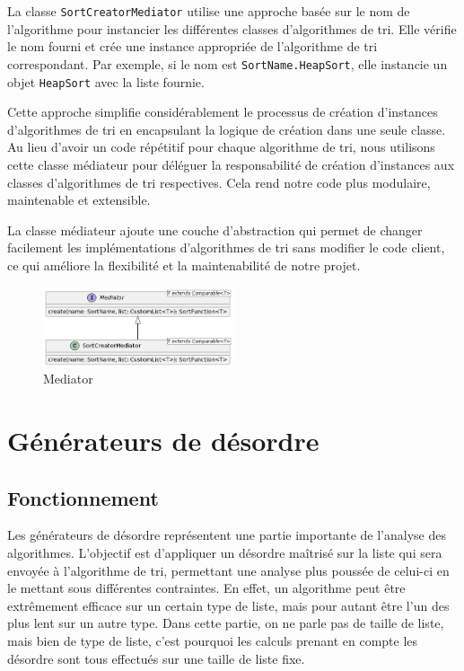 \documentclass[a4paper,12pt]{article}
\begin{document}
La classe \texttt{SortCreatorMediator} utilise une approche basée sur le nom de l'algorithme pour instancier les différentes classes d'algorithmes de tri. Elle vérifie le nom fourni et crée une instance appropriée de l'algorithme de tri correspondant. Par exemple, si le nom est \texttt{SortName.HeapSort}, elle instancie un objet \texttt{HeapSort} avec la liste fournie.

Cette approche simplifie considérablement le processus de création d'instances d'algorithmes de tri en encapsulant la logique de création dans une seule classe. Au lieu d'avoir un code répétitif pour chaque algorithme de tri, nous utilisons cette classe médiateur pour déléguer la responsabilité de création d'instances aux classes d'algorithmes de tri respectives. Cela rend notre code plus modulaire, maintenable et extensible.

La classe médiateur ajoute une couche d'abstraction qui permet de changer facilement les implémentations d'algorithmes de tri sans modifier le code client, ce qui améliore la flexibilité et la maintenabilité de notre projet.\\


\begin{figure}[h]
    \centering
    \includegraphics[width=0.5\textwidth]{Mediator.png}
    \caption{Mediator}
    \label{fig:mon_image}
\end{figure}


\section{Générateurs de désordre}
\subsection{Fonctionnement}
Les générateurs de désordre représentent une partie importante de l'analyse des algorithmes. L'objectif est d'appliquer un désordre maîtrisé sur la liste qui sera envoyée à l'algorithme de tri, permettant une analyse plus poussée de celui-ci en le mettant sous différentes contraintes. En effet, un algorithme peut être extrêmement efficace sur un certain type de liste, mais pour autant être l'un des plus lent sur un autre type. Dans cette partie, on ne parle pas de taille de liste, mais bien de type de liste, c'est pourquoi les calculs prenant en compte les désordre sont tous effectués sur une taille de liste fixe.
\end{document}
